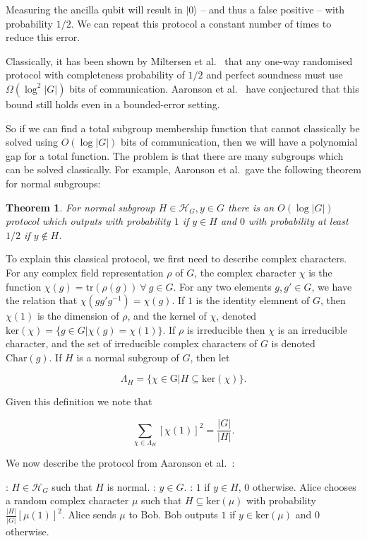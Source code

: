 \documentclass[a4paper]{article}
\newtheorem{theorem}{Theorem}[section]
\begin{document}
        Measuring the ancilla qubit will result in $|0\rangle$ -- and thus a false positive -- with probability $1/2$. We can repeat this protocol a constant number of times to reduce this error.

        Classically, it has been shown by Miltersen et al.~\cite{Miltersen199837} that any one-way randomised protocol with completeness probability of $1/2$ and perfect soundness must use $\Omega(\log^2|G|)$ bits of communication. Aaronson et al.~ have conjectured that this bound still holds even in a bounded-error setting.

        So if we can find a total subgroup membership function that cannot classically be solved using $O(\log |G|)$ bits of communication, then we will have a polynomial gap for a total function. The problem is that there are many subgroups which can be solved classically. For example, Aaronson et al.~gave the following theorem for normal subgroups:

        \begin{theorem}
            \label{thm:norm-sg-membership}
            For normal subgroup $H \in \mathscr{H}_G, y \in G$ there is an $O(\log|G|)$ protocol which outputs with probability $1$ if $y \in H$ and $0$ with probability at least $1/2$ if $y \notin H$.
        \end{theorem}

        To explain this classical protocol, we first need to describe complex characters. For any complex field representation $\rho$ of $G$, the complex character $\chi$ is the function $\chi(g) = \textrm{tr}(\rho(g))~\forall~g\in G$. For any two elements $g, g' \in G$, we have the relation that $\chi(gg'g^{-1}) = \chi(g)$. If $1$ is the identity elemnent of $G$, then $\chi(1)$ is the dimension of $\rho$, and the kernel of $\chi$, denoted $\textrm{ker}(\chi) = \{g \in G|\chi(g) = \chi(1)\}$. If $\rho$ is irreducible then $\chi$ is an irreducible character, and the set of irreducible complex characters of $G$ is denoted $\textrm{Char}(g)$. If $H$ is a normal subgroup of $G$, then let

        $$\Lambda_H = \{\chi \in \textrm{G}|H\subseteq \textrm{ker}(\chi)\}.$$

        Given this definition we note that

        $$\sum_{\chi \in \Lambda_H}[\chi(1)]^2 = \frac{|G|}{|H|}.$$

        We now describe the protocol from Aaronson et al.~\cite{0902.3175}:

        \begin{codebox}
            \zi {}: $H \in \mathscr{H}_G$ such that $H$ is normal.
            \zi {}: $y \in G$.
            \zi {}: $1$ if $y \in H$, $0$ otherwise.
            \li Alice chooses a random complex character $\mu$ such that $H \subseteq \textrm{ker}(\mu)$ with probability $\frac{|H|}{|G|}[\mu(1)]^2$.
            \li Alice sends $\mu$ to Bob.
            \li Bob outputs $1$ if $y \in \textrm{ker}(\mu)$ and $0$ otherwise.
        \end{codebox}
\end{document}

